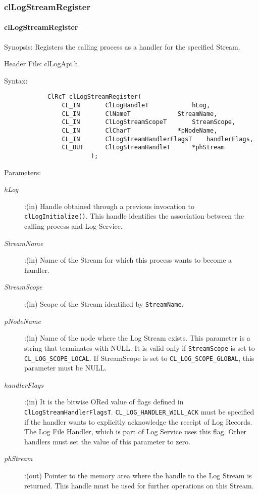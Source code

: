 \begin{flushleft}
\subsubsection{clLogStreamRegister}
\hypertarget{pagelog112}{}\paragraph{cl\-Log\-Stream\-Register}\label{pagelog112}
\begin{Desc}
\item[Synopsis:] Registers the calling process as a handler for the specified Stream.\end{Desc}
\begin{Desc}
\item[Header File:] clLogApi.h \end{Desc}
\begin{Desc}
\item[Syntax:]
\footnotesize\begin{verbatim}        	
			ClRcT clLogStreamRegister(
				CL_IN		ClLogHandleT			hLog,
				CL_IN		ClNameT				StreamName,
				CL_IN		ClLogStreamScopeT		StreamScope,
				CL_IN		ClCharT				*pNodeName,
				CL_IN		ClLogStreamHandlerFlagsT	handlerFlags,
				CL_OUT		ClLogStreamHandleT		*phStream
						);
\end{verbatim}
\normalsize
\end{Desc}
\begin{Desc}
\item[Parameters:] \begin{description}
\item[{\em hLog}]:(in) Handle obtained through a previous invocation to {\tt{clLogInitialize()}}. This handle identifies the association between the 
calling process and Log Service.
\item[{\em StreamName}]:(in) Name of the Stream for which this process wants to become a handler.
\item[{\em StreamScope}]:(in) Scope of the Stream identified by {\tt{StreamName}}.
\item[{\em *pNodeName}]:(in) Name of the node where the Log Stream exists. This parameter is a string that terminates with NULL. It is valid only if 
{\tt{StreamScope}} is set to {\tt{CL\_\-LOG\_\-SCOPE\_\-LOCAL}}. If StreamScope is set to {\tt{CL\_\-LOG\_\-SCOPE\_\-GLOBAL}}, this parameter must be NULL.
\item[{\em handlerFlags}]:(in) It is the bitwise ORed value of flags defined in {\tt{ClLogStreamHandlerFlagsT}}. 
{\tt{CL\_\-LOG\_\-HANDLER\_\-WILL\_\-ACK}} must be specified if the handler wants to explicitly acknowledge the receipt of Log Records. 
The Log File Handler, which is part of Log Service uses this flag. Other handlers must set the value of this parameter to zero.
\item[{\em *phStream}]:(out) Pointer to the memory area where the handle to the Log Stream is returned. This handle must be used for further operations 
on this Stream.
\end{description}
\end{Desc}
\begin{Desc}


\end{Desc}
\end{flushleft}
